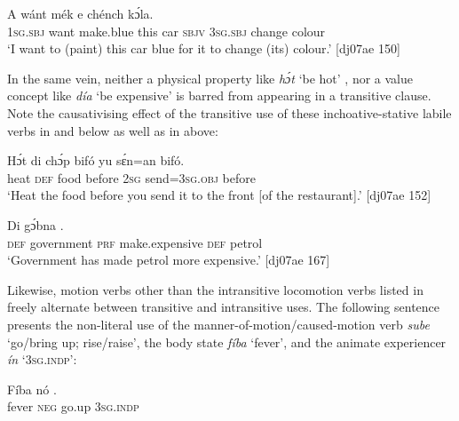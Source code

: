 \ea%
    \label{ex:key:1105}
    \gll A    wánt            mék    e    chénch  kɔ́la.\\
\textsc{1sg.sbj}  want  make.blue  this  car    \textsc{sbjv}    \textsc{3sg.sbj}  change  colour\\

\glt ‘I want to (paint) this car blue for it to change (its) colour.’ [dj07ae 150]
\z

In the same vein, neither a physical property like \textit{hɔ́t} ‘be hot’ , nor a value concept like \textit{día} ‘be expensive’  is barred from appearing in a transitive clause. Note the causativising effect of the transitive use of these inchoative-stative labile verbs in  and  below as well as in  above: 

\ea%
    \label{ex:key:1106}
    \gll Hɔ́t    di  chɔ́p  bifó    yu  sɛ́n=an    bifó.\\
heat    \textsc{def}  food    before  \textsc{2sg}  send=\textsc{3sg.obj}  before\\

\glt ‘Heat the food before you send it to the front [of the restaurant].’ [dj07ae 152]
\z


\ea%
    \label{ex:key:1107}
    \gll Di  gɔ́bna                .\\
\textsc{def}  government  \textsc{prf}  make.expensive  \textsc{def}  petrol\\

\glt ‘Government has made petrol more expensive.’ [dj07ae 167]
\z

Likewise, motion verbs other than the intransitive locomotion verbs listed in  freely alternate between transitive and intransitive uses. The following sentence presents the non-literal use of the manner-of-motion/caused-motion verb \textit{sube} ‘go/bring up; rise/raise’, the body state \textit{fíba} ‘fever’, and the animate experiencer \textit{ín} ‘\textsc{3sg.indp}’: 


\ea%
    \label{ex:key:1108}
    \gll Fíba    nó    .\\
fever  \textsc{neg}  go.up  \textsc{3sg.indp}\\

